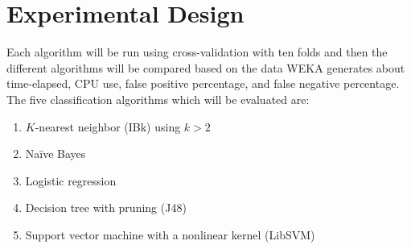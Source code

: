 \documentclass[twoside,11pt]{article}
\begin{document}
\section{Experimental Design}
Each algorithm will be run using cross-validation with ten folds and then the different algorithms will be compared based on the data WEKA generates about time-elapsed, CPU use, false positive percentage, and false negative percentage. The five classification algorithms which will be evaluated are:
\begin{enumerate}
\item $K$-nearest neighbor (IBk) using $k>2$
\item Na\"ive Bayes
\item Logistic regression
\item Decision tree with pruning (J48)
\item Support vector machine with a nonlinear kernel (LibSVM)
\end{enumerate}

\pagebreak
\vskip 0.2in

\end{document}
